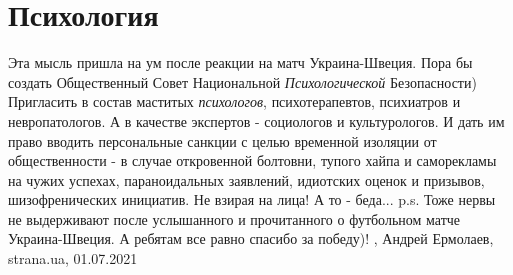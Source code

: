  
 
 
 
 
\chapter{Психология}

Эта мысль пришла на ум после реакции на матч Украина-Швеция. Пора бы создать
Общественный Совет Национальной \emph{Психологической} Безопасности) Пригласить
в состав маститых \emph{психологов}, психотерапевтов, психиатров и
невропатологов. А в качестве экспертов - социологов и культурологов. И дать им
право вводить персональные санкции с целью временной изоляции от общественности
- в случае откровенной болтовни, тупого хайпа и саморекламы на чужих успехах,
параноидальных заявлений, идиотских оценок и призывов, шизофренических
инициатив.  Не взирая на лица!  А то - беда...  p.s. Тоже нервы не выдерживают
после услышанного и прочитанного о футбольном матче Украина-Швеция.  А ребятам
все равно спасибо за победу)!
, 
Андрей Ермолаев, strana.ua, 01.07.2021

